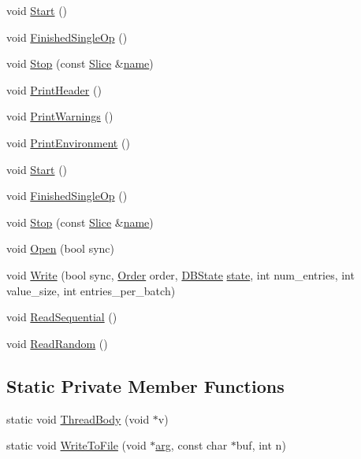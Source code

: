 \begin{DoxyCompactItemize}
\item 
void \hyperlink{classleveldb_1_1_benchmark_a425b045a0e0adc6bf680e5928bbe6047}{Start} ()
\item 
void \hyperlink{classleveldb_1_1_benchmark_acca3e72cfbf640d11acae8d58344ee48}{Finished\-Single\-Op} ()
\item 
void \hyperlink{classleveldb_1_1_benchmark_a65d0797253a00efc34b160a59aeb77c1}{Stop} (const \hyperlink{classleveldb_1_1_slice}{Slice} \&\hyperlink{testharness_8cc_a8f8f80d37794cde9472343e4487ba3eb}{name})
\item 
void \hyperlink{classleveldb_1_1_benchmark_a15b286cc29560860abc89217e4b5c079}{Print\-Header} ()
\item 
void \hyperlink{classleveldb_1_1_benchmark_aa0b2a30493347ff50cbf28772cfaca9d}{Print\-Warnings} ()
\item 
void \hyperlink{classleveldb_1_1_benchmark_ac99c8911fbe6bc43acd785cf28d3f5a7}{Print\-Environment} ()
\item 
void \hyperlink{classleveldb_1_1_benchmark_a425b045a0e0adc6bf680e5928bbe6047}{Start} ()
\item 
void \hyperlink{classleveldb_1_1_benchmark_acca3e72cfbf640d11acae8d58344ee48}{Finished\-Single\-Op} ()
\item 
void \hyperlink{classleveldb_1_1_benchmark_a65d0797253a00efc34b160a59aeb77c1}{Stop} (const \hyperlink{classleveldb_1_1_slice}{Slice} \&\hyperlink{testharness_8cc_a8f8f80d37794cde9472343e4487ba3eb}{name})
\item 
void \hyperlink{classleveldb_1_1_benchmark_aa4cb9514dd070f754d13e7cd585ae2a6}{Open} (bool sync)
\item 
void \hyperlink{classleveldb_1_1_benchmark_aabf4d3f9eb9062f6cbf4ee9771da4827}{Write} (bool sync, \hyperlink{classleveldb_1_1_benchmark_a4694fe0f2fd06d7da386305a339ddbc4}{Order} order, \hyperlink{classleveldb_1_1_benchmark_ad94bd817d74359a4d8cea6da609a28d4}{D\-B\-State} \hyperlink{version__set_8cc_a6aad002d0db5e5e85dc31927a5a6f503}{state}, int num\-\_\-entries, int value\-\_\-size, int entries\-\_\-per\-\_\-batch)
\item 
void \hyperlink{classleveldb_1_1_benchmark_a301897d0609459c5e6072db05da6b737}{Read\-Sequential} ()
\item 
void \hyperlink{classleveldb_1_1_benchmark_ac822394de61c12dd6a8a0e0c64760da5}{Read\-Random} ()
\end{DoxyCompactItemize}
\subsection*{Static Private Member Functions}
\begin{DoxyCompactItemize}
\item 
static void \hyperlink{classleveldb_1_1_benchmark_a89b8e81e1e114527f7096bf333de426c}{Thread\-Body} (void $\ast$v)
\item 
static void \hyperlink{classleveldb_1_1_benchmark_a1e16eff8e9a6acef8679f293916ad01a}{Write\-To\-File} (void $\ast$\hyperlink{env__posix_8cc_a9ce2ec4812a92cb6ab39f6e81e9173a9}{arg}, const char $\ast$buf, int n)
\end{DoxyCompactItemize}
